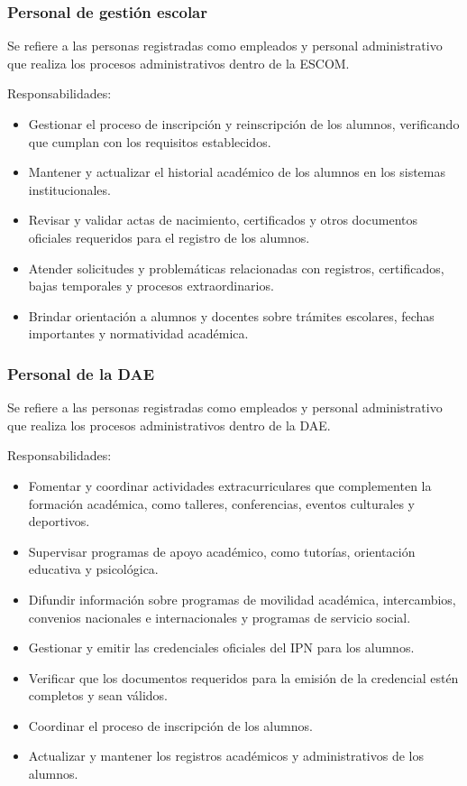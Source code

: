 \begin{Usuario}{\hypertarget{tPersonalGestion}{\subsubsection{Personal de gestión escolar}}}{
    Se refiere a las personas registradas como empleados y personal administrativo que realiza los procesos administrativos dentro de la ESCOM.
}
\item[Responsabilidades:] \cdtEmpty
\begin{itemize}
    \item Gestionar el proceso de inscripción y reinscripción de los alumnos, verificando que cumplan con los requisitos establecidos.
    \item Mantener y actualizar el historial académico de los alumnos en los sistemas institucionales.
    \item Revisar y validar actas de nacimiento, certificados y otros documentos oficiales requeridos para el registro de los alumnos.
    \item Atender solicitudes y problemáticas relacionadas con registros, certificados, bajas temporales y procesos extraordinarios.
    \item Brindar orientación a alumnos y docentes sobre trámites escolares, fechas importantes y normatividad académica.
\end{itemize}
\end{Usuario}

\begin{Usuario}{\hypertarget{tPersonalDAE}{\subsubsection{Personal de la DAE}}}{
    Se refiere a las personas registradas como empleados y personal administrativo que realiza los procesos administrativos dentro de la DAE.
}

\item[Responsabilidades:] \cdtEmpty
\begin{itemize}
    \item Fomentar y coordinar actividades extracurriculares que complementen la formación académica, como talleres, conferencias, eventos culturales y deportivos.
    \item Supervisar programas de apoyo académico, como tutorías, orientación educativa y psicológica.
    \item Difundir información sobre programas de movilidad académica, intercambios, convenios nacionales e internacionales y programas de servicio social.
    \item Gestionar y emitir las credenciales oficiales del IPN para los alumnos.
    \item Verificar que los documentos requeridos para la emisión de la credencial estén completos y sean válidos.
    \item Coordinar el proceso de inscripción de los alumnos.
    \item Actualizar y mantener los registros académicos y administrativos de los alumnos. 

\end{itemize}
\end{Usuario}


